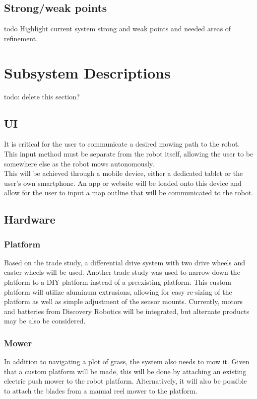 \documentclass[12pt]{extarticle}
\begin{document}
  \subsection{Strong/weak points}
   todo
   Highlight current system strong and weak points and needed areas of
    refinement.

\section{Subsystem Descriptions}
  todo: delete this section?
  \subsection{UI}
  It is critical for the user to communicate a desired mowing path to the robot. This input method must be separate from the robot itself, allowing the user to be somewhere else as the robot mows autonomously. \\
  
  This will be achieved through a mobile device, either a dedicated tablet or the user's own smartphone. An app or website will be loaded onto this device and allow for the user to input a map outline that will be communicated to the robot. 
  
  \subsection{Hardware}
    \subsubsection{Platform}
      Based on the trade study, a differential drive system with two drive wheels and caster wheels will be used. Another trade study was used to narrow down the platform to a DIY platform instead of a preexisting platform. This custom platform will utilize aluminum extrusions, allowing for easy re-sizing of the platform as well as simple adjustment of the sensor mounts. Currently, motors and batteries from Discovery Robotics will be integrated, but alternate products may be also be considered. 
      
    \subsubsection{Mower}
      In addition to navigating a plot of grass, the system also needs to mow it. Given that a custom platform will be made, this will be done by attaching an existing electric push mower to the robot platform. Alternatively, it will also be possible to attach the blades from a manual reel mower to the platform. 
  
\end{document}
